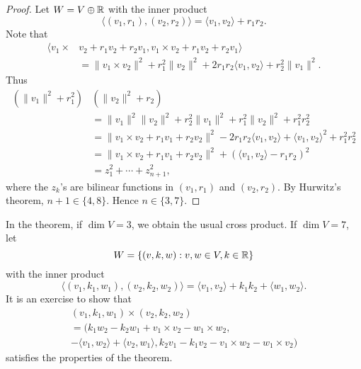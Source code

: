 \begin{proof}
	Let $W=V\oplus\mathbb{R}$ with the inner product  
	\[
		\langle (v_1,r_1),(v_2,r_2)\rangle = \langle v_1,v_2\rangle+r_1r_2.
	\]
	Note that
	\begin{align*}
		\langle v_1\times &v_2+r_1v_2+r_2v_1,v_1\times v_2+r_1v_2+r_2v_1\rangle\\
		&=\|v_1\times v_2\|^2+r_1^2\|v_2\|^2+2r_1r_2\langle v_1,v_2\rangle+r_2^2\|v_1\|^2.
	\end{align*}
	Thus  
	\begin{align*}
		(\|v_1\|^2+r_1^2)&(\|v_2\|^2+r_2)\\
		&= \|v_1\|^2\|v_2\|^2+r_2^2\|v_1\|^2+r_1^2\|v_2\|^2+r_1^2r_2^2\\
		&=\|v_1\times v_2+r_1v_1+r_2v_2\|^2-2r_1r_2\langle v_1,v_2\rangle+\langle v_1,v_2\rangle^2+r_1^2r_2^2\\
		&=\|v_1\times v_2+r_1v_1+r_2v_2\|^2+(\langle v_1,v_2\rangle-r_1r_2)^2\\
		&=z_1^2+\cdots+z_{n+1}^2,
	\end{align*}
	where the $z_k$'s are bilinear functions in $(v_1,r_1)$ and $(v_2,r_2)$. 
	By Hurwitz's theorem, 
	$n+1\in\{4,8\}$. Hence $n\in\{3,7\}$.
\end{proof}

In the theorem, if $\dim V=3$, we obtain the usual cross product. 
If $\dim V=7$, let 
\[
	W=\{(v,k,w):v,w\in V,k\in\mathbb{R}\}
\]
with the inner product 
\[
	\langle (v_1,k_1,w_1),(v_2,k_2,w_2)\rangle = \langle v_1,v_2\rangle+k_1k_2+\langle w_1,w_2\rangle.
\]
It is an exercise to show that 
\begin{multline*}
	(v_1,k_1,w_1)\times (v_2,k_2,w_2)\\
	=(k_1w_2-k_2w_1+v_1\times v_2-w_1\times w_2,
	\\-\langle v_1,w_2\rangle+\langle v_2,w_1\rangle, 
	k_2v_1-k_1v_2-v_1\times w_2-w_1\times v_2)
\end{multline*}
satisfies the properties of the theorem. 

